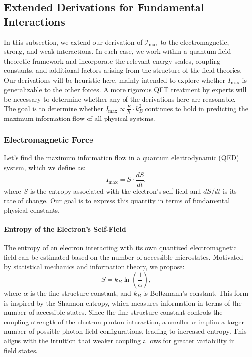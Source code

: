 \documentclass[12pt]{article}
\begin{document}
\subsection{Extended Derivations for Fundamental Interactions}

In this subsection, we extend our derivation of \(\mathcal{I}_{\max}\) to the electromagnetic, strong, and weak interactions. In each case, we work within a quantum field theoretic framework and incorporate the relevant energy scales, coupling constants, and additional factors arising from the structure of the field theories. Our derivations will be heuristic here, mainly intended to explore whether $I_\text{max}$ is generalizable to the other forces. A more rigorous QFT treatment by experts will be necessary to determine whether any of the derivations here are reasonable. The goal is to determine whether $I_\text{max} \propto \frac{E}{\hbar}\cdot k_B^2$ continues to hold in predicting the maximum information flow of all physical systems.

\subsubsection{Electromagnetic Force}

Let's find the maximum information flow in a quantum electrodynamic (QED) system, which we define as:
\begin{equation}
    I_{\max} = S \cdot \frac{dS}{dt},
\end{equation}
where $S$ is the entropy associated with the electron's self-field and $dS/dt$ is its rate of change. Our goal is to express this quantity in terms of fundamental physical constants.

\paragraph{Entropy of the Electron's Self-Field}

The entropy of an electron interacting with its own quantized electromagnetic field can be estimated based on the number of accessible microstates. Motivated by statistical mechanics and information theory, we propose:
\begin{equation}
    S = k_B \ln\left(\frac{1}{\alpha}\right),
\end{equation}
where $\alpha$ is the fine structure constant, and $k_B$ is Boltzmann’s constant. This form is inspired by the Shannon entropy, which measures information in terms of the number of accessible states. Since the fine structure constant controls the coupling strength of the electron-photon interaction, a smaller $\alpha$ implies a larger number of possible photon field configurations, leading to increased entropy. This aligns with the intuition that weaker coupling allows for greater variability in field states.
\end{document}
